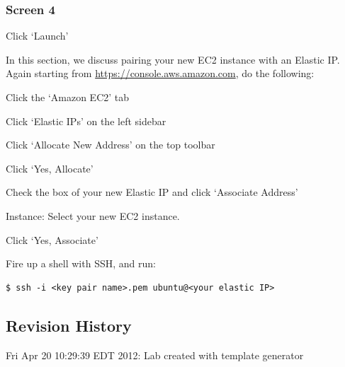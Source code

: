 \documentclass{article}
\begin{document}
\subsubsection*{Screen 4}

Click `Launch'


In this section, we discuss pairing your new EC2 instance with an Elastic IP. Again starting from \href{https://console.aws.amazon.com}{https://console.aws.amazon.com}, do the following:

\begin{enumerate*}
\item Click the `Amazon EC2' tab
\item Click `Elastic IPs' on the left sidebar
\item Click `Allocate New Address' on the top toolbar
\item Click `Yes, Allocate'
\item Check the box of your new Elastic IP and click `Associate Address'
\begin{enumerate*}
\item Instance: Select your new EC2 instance.
\item Click `Yes, Associate'
\end{enumerate*}
\end{enumerate*}


Fire up a shell with SSH, and run:

\begin{verbatim}
$ ssh -i <key pair name>.pem ubuntu@<your elastic IP>
\end{verbatim}



\subsection*{Revision History}
\begin{itemize*}
 \item Fri Apr 20 10:29:39 EDT 2012: Lab created with template generator
\end{itemize*}
\end{document}
